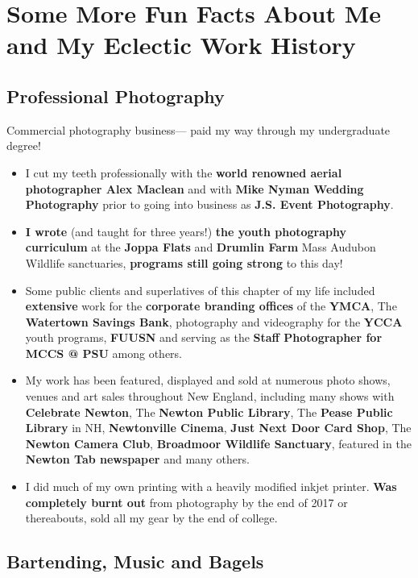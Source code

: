 \documentclass[11pt,letterpaper]{article}
\begin{document}
\section{Some More Fun Facts About Me and My Eclectic Work History}
\label{sec:funfacts}

\subsection{Professional Photography}

Commercial photography business--- paid my way through my undergraduate degree!

\begin{itemize}
    \item I cut my teeth professionally with the \textbf{world renowned aerial photographer Alex Maclean} and with \textbf{Mike Nyman Wedding Photography} prior to going into business as \textbf{J.S. Event Photography}.
    \item \textbf{I wrote} (and taught for three years!) \textbf{the youth photography curriculum} at the \textbf{Joppa Flats} and \textbf{Drumlin Farm} Mass Audubon Wildlife sanctuaries, \textbf{programs still going strong} to this day!
    \item Some public clients and superlatives of this chapter of my life included \textbf{extensive} work for the \textbf{corporate branding offices} of the \textbf{YMCA}, The \textbf{Watertown Savings Bank}, photography and videography for the \textbf{YCCA} youth programs, \textbf{FUUSN} and serving as the \textbf{Staff Photographer for MCCS @ PSU} among others.
    \item My work has been featured, displayed and sold at numerous photo shows, venues and art sales throughout New England, including many shows with \textbf{Celebrate Newton}, The \textbf{Newton Public Library}, The \textbf{Pease Public Library} in NH, \textbf{Newtonville Cinema}, \textbf{Just Next Door Card Shop}, The \textbf{Newton Camera Club}, \textbf{Broadmoor Wildlife Sanctuary}, featured in the \textbf{Newton Tab newspaper} and many others.
    \item I did much of my own printing with a heavily modified inkjet printer. \textbf{Was completely burnt out} from photography by the end of 2017 or thereabouts, sold all my gear by the end of college.
\end{itemize}

\vspace{0.8em}

\subsection{Bartending, Music and Bagels}
\end{document}
